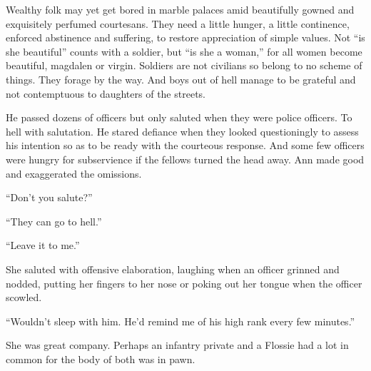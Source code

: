 Wealthy folk may yet get bored in marble palaces amid beautifully gowned and exquisitely perfumed courtesans. They need a little hunger, a little continence, enforced abstinence and suffering, to restore appreciation of simple values. Not ``is she beautiful'' counts with a soldier, but ``is she a woman,'' for all women become beautiful, magdalen or virgin. Soldiers are not civilians so belong to no scheme of things. They forage by the way. And boys out of hell manage to be grateful and not contemptuous to daughters of the streets.

He passed dozens of officers but only saluted when they were police officers. To hell with salutation. He stared defiance when they looked questioningly to assess his intention so as to be ready with the courteous response. And some few officers were hungry for subservience if the fellows turned the head away. Ann made good and exaggerated the omissions.

``Don't you salute?''

``They can go to hell.''

``Leave it to me.''

She saluted with offensive elaboration, laughing when an officer grinned and nodded, putting her fingers to her nose or poking out her tongue when the officer scowled.

``Wouldn't sleep with him. He'd remind me of his high rank every few minutes.''

She was great company. Perhaps an infantry private and a Flossie had a lot in common for the body of both was in pawn.

